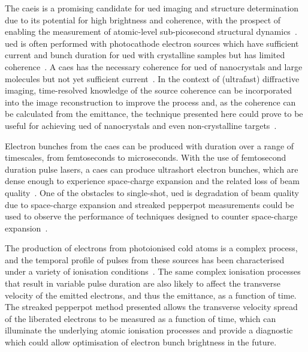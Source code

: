 The \gls{caeis} is a promising candidate for \gls{ued} imaging and structure determination due to its potential for high brightness and coherence, with the prospect of enabling the measurement of atomic-level sub-picosecond structural dynamics~\cite{siwick_atomic-level_2003,putkunz_atom-scale_2012,sparkes_high-coherence_2014}.
\gls{ued} is often performed with photocathode electron sources which have sufficient current and bunch duration for \gls{ued} with crystalline samples but has limited coherence~\cite{van_oudheusden_electron_2007,tokita_single-shot_2009,sciaini_femtosecond_2011}.
A \gls{caes} has the necessary coherence for \gls{ued} of nanocrystals and large molecules but not yet sufficient current~\cite{saliba_spatial_2012,mcculloch_high-coherence_2013}.
In the context of (ultrafast) diffractive imaging, time-resolved knowledge of the source coherence can be incorporated into the image reconstruction to improve the process and, as the coherence can be calculated from the emittance, the technique presented here could prove to be useful for achieving \gls{ued} of nanocrystals and even non-crystalline targets~\cite{flewett_extracting_2009,abbey_lensless_2011}.

Electron bunches from the \gls{caes} can be produced with duration over a range of timescales, from femtoseconds to microseconds.
With the use of femtosecond duration pulse lasers, a \gls{caes} can produce ultrashort electron bunches, which are dense enough to experience space-charge expansion and the related loss of beam quality~\cite{luiten_how_2004,van_oudheusden_compression_2010,thompson_suppression_2016}.
One of the obstacles to single-shot, \gls{ued} is degradation of beam quality due to space-charge expansion and streaked pepperpot measurements could be used to observe the performance of techniques designed to counter space-charge expansion~\cite{thompson_suppression_2016}.

The production of electrons from photoionised cold atoms is a complex process, and the temporal profile of pulses from these sources has been characterised under a variety of ionisation conditions~\cite{speirs_identification_2017}.
The same complex ionisation processes that result in variable pulse duration are also likely to affect the transverse velocity of the emitted electrons, and thus the emittance, as a function of time.
The streaked pepperpot method presented allows the transverse velocity spread of the liberated electrons to be measured as a function of time, which can illuminate the underlying atomic ionisation processes and provide a diagnostic which could allow optimisation of electron bunch brightness in the future.

